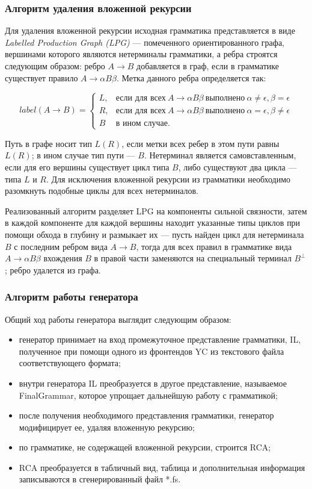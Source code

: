 \documentclass[14pt]{matmex-diploma-custom}
\begin{document}
\subsubsection{Алгоритм удаления вложенной рекурсии}
Для удаления вложенной рекурсии исходная грамматика представляется в виде \textit{Labelled Production Graph (LPG)} --- помеченного ориентированного графа, вершинами которого являются нетерминалы грамматики, а ребра строятся следующим образом: ребро $A \rightarrow B$ добавляется в граф, если в грамматике существует правило $A \rightarrow \alpha B \beta$. Метка данного ребра определяется так: 

$$ label(A \rightarrow B) = 
\begin{cases}
    L, & \text{если для всех} \ A \rightarrow \alpha B \beta \ \text{выполнено} \ \alpha \neq \epsilon, \beta = \epsilon \\
    R, & \text{если для всех} \ A \rightarrow \alpha B \beta \ \text{выполнено} \ \alpha = \epsilon, \beta \neq \epsilon \\
    B  & \text{в ином случае.}
\end{cases} $$

Путь в графе носит тип $L(R)$, если метки всех ребер в этом пути равны $L(R)$; в ином случае тип пути --- $B$. Нетерминал является самовставленным, если для его вершины существует цикл типа $B$, либо существуют два цикла --- типа $L$ и $R$. Для исключения вложенной рекурсии из грамматики необходимо разомкнуть подобные циклы для всех нетерминалов. 

Реализованный алгоритм разделяет LPG на компоненты сильной связности, затем в каждой компоненте для каждой вершины находит указанные типы циклов при помощи обхода в глубину и размыкает их --- пусть найден цикл для нетерминала $B$ с последним ребром вида $A \rightarrow B$, тогда для всех правил в грамматике вида $A \rightarrow \alpha B \beta$ вхождения $B$ в правой части заменяются на специальный терминал $B^\perp$; ребро удалется из графа.

	
\subsubsection{Алгоритм работы генератора}
Общий ход работы генератора выглядит следующим образом:
\begin{itemize}
\item генератор принимает на вход промежуточное представление грамматики, IL, полученное при помощи одного из фронтендов YC из текстового файла соответствующего формата;
\item внутри генератора IL преобразуется в другое представление, называемое FinalGrammar, которое упрощает дальнейшую работу с грамматикой;
\item после получения необходимого представления грамматики, генератор модифицирует ее, удаляя вложенную рекурсию;
\item по грамматике, не содержащей вложенной рекурсии, строится RCA;
\item RCA преобразуется в табличный вид, таблица и дополнительная информация записываются в сгенерированный файл *.fs.
\end{itemize}
\end{document}

